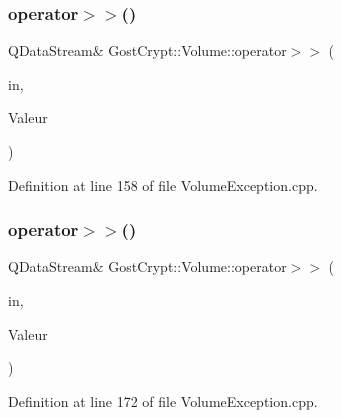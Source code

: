 \subsubsection{\texorpdfstring{operator$>$$>$()}{operator>>()}\hspace{0.1cm}{\footnotesize\ttfamily [11/19]}}
{\footnotesize\ttfamily Q\+Data\+Stream\& Gost\+Crypt\+::\+Volume\+::operator$>$$>$ (\begin{DoxyParamCaption}\item[{Q\+Data\+Stream \&}]{in,  }\item[{\hyperlink{class_gost_crypt_1_1_volume_1_1_volume_corrupted}{Gost\+Crypt\+::\+Volume\+::\+Volume\+Corrupted} \&}]{Valeur }\end{DoxyParamCaption})}



Definition at line 158 of file Volume\+Exception.\+cpp.

\mbox{\label{namespace_gost_crypt_1_1_volume_a976a45e024ee914284bafac02176a7bb}} 
\subsubsection{\texorpdfstring{operator$>$$>$()}{operator>>()}\hspace{0.1cm}{\footnotesize\ttfamily [12/19]}}
{\footnotesize\ttfamily Q\+Data\+Stream\& Gost\+Crypt\+::\+Volume\+::operator$>$$>$ (\begin{DoxyParamCaption}\item[{Q\+Data\+Stream \&}]{in,  }\item[{\hyperlink{class_gost_crypt_1_1_volume_1_1_failed_get_timestamps}{Gost\+Crypt\+::\+Volume\+::\+Failed\+Get\+Timestamps} \&}]{Valeur }\end{DoxyParamCaption})}



Definition at line 172 of file Volume\+Exception.\+cpp.

\mbox{\label{namespace_gost_crypt_1_1_volume_a8f37b1f061b7e84cfce701493bb13c58}} 
